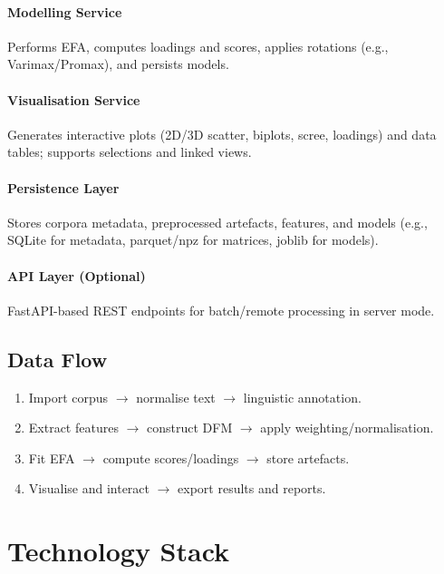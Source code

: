 \paragraph{Modelling Service}
Performs EFA, computes loadings and scores, applies rotations (e.g., Varimax/Promax), and persists models.

\paragraph{Visualisation Service}
Generates interactive plots (2D/3D scatter, biplots, scree, loadings) and data tables; supports selections and linked views.

\paragraph{Persistence Layer}
Stores corpora metadata, preprocessed artefacts, features, and models (e.g., SQLite for metadata, parquet/npz for matrices, joblib for models).

\paragraph{API Layer (Optional)}
FastAPI-based REST endpoints for batch/remote processing in server mode.

\subsection{Data Flow}

\begin{enumerate}
    \item Import corpus $\rightarrow$ normalise text $\rightarrow$ linguistic annotation.
    \item Extract features $\rightarrow$ construct DFM $\rightarrow$ apply weighting/normalisation.
    \item Fit EFA $\rightarrow$ compute scores/loadings $\rightarrow$ store artefacts.
    \item Visualise and interact $\rightarrow$ export results and reports.
\end{enumerate}

\section{Technology Stack}

